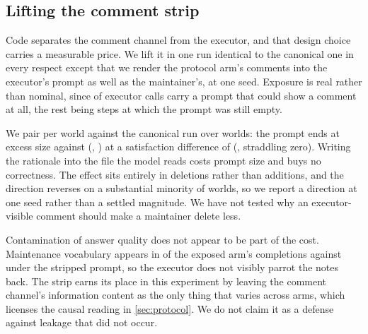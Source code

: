 \subsection{Lifting the comment strip}
\label{sec:appendix:failures}

Code separates the comment channel from the executor, and that design choice carries a measurable
price. We lift it in one run identical to the canonical one in every respect except that we render
the protocol arm's comments into the executor's prompt as well as the maintainer's, at one seed.
Exposure is real rather than nominal, since \InlineExposure{} of executor calls carry a prompt that
could show a comment at all, the rest being steps at which the prompt was still empty.

We pair per world against the canonical run over \InlineWorlds{} worlds: the prompt ends at
\InlineExcessPct{} excess size against \InlineRefExcessPct{} (\InlineDeltaExcessPp{},
\InlineDeltaExcessCI{}) at a satisfaction difference of \InlineDeltaSatPp{} (\InlineDeltaSatCI{},
straddling zero). Writing the
rationale into the file the model reads costs prompt size and buys no correctness. The effect sits
entirely in deletions rather than additions, and the direction reverses on a substantial minority
of worlds, so we report a direction at one seed rather than a settled magnitude. We have not tested
why an executor-visible comment should make a maintainer delete less.

Contamination of answer quality does not appear to be part of the cost. Maintenance vocabulary
appears in \InlineLeakage{} of the exposed arm's completions against \InlineLeakageControl{} under
the stripped prompt, so the executor does not visibly parrot the notes back. The strip earns its
place in this experiment by leaving the comment channel's information content as the only thing
that varies across arms, which licenses the causal reading in \autoref{sec:protocol}. We do not
claim it as a defense against leakage that did not occur.

